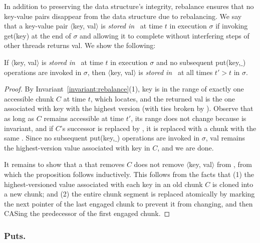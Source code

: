In addition to preserving the data structure's integrity, rebalance ensures that no key-value pairs disappear from the data structure due to rebalancing. 
We say that a key-value pair $\langle$key, val$ \rangle$ is \emph{stored in} \kiwi\ at time $t$ in execution $\sigma$ if invoking get(key) at the end of $\sigma$
and allowing it to complete without interfering steps of other threads returns val. We show the following:

\begin{proposition}
If $\langle$key, val$ \rangle$ is \emph{stored in} \kiwi\ at time $t$ in execution $\sigma$ and no subsequent put(key,$\_$)  operations are invoked in $\sigma$, 
then $\langle$key, val$ \rangle$ is \emph{stored in} \kiwi\ at all times $t' > t$ in  $\sigma$.
\label{proposition:no-loss}
\end{proposition}
\begin{proof}
By Invariant~\ref{invariant:rebalance}(1), key is in the range of exactly one accessible chunk $C$ at time $t$,  which   locates, 
and the returned val is the one associated with key with the highest version (with ties broken by ). 
Observe that as long as $C$ remains accessible at time $t'$, its range does not change because  is invariant, and if $C$'s successor is 
replaced by , it is replaced with a chunk with the same . 
Since no   subsequent put(key,$\_$)  operations are invoked in $\sigma$, val remains the highest-version value associated with key in $C$, and we are done.

It remains to show that a  that removes $C$ does not remove $\langle$key, val$ \rangle$ from \kiwi, from which the proposition follows   inductively.
This follows from the facts that (1) the highest-versioned value associated with each key in an old chunk $C$ is cloned into a new chunk; and 
(2) the entire chunk segment is replaced atomically by marking the next pointer of the last engaged chunk to prevent it from changing, and then 
CASing the predecessor of the first engaged chunk.
 \end{proof}

\subsubsection{Puts.} 
\label{ssec:put-proof}

